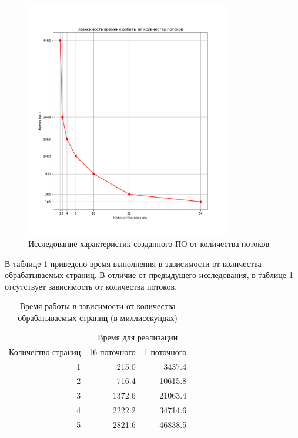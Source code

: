 \begin{figure}[h!]
    \centering
    \includegraphics[width=0.8\textwidth]{images/image1}
    \caption{Исследование характеристик созданного ПО от количества потоков}
    \label{fig:image1}
\end{figure}


\clearpage

В таблице \ref{tbl:time_measurements2} приведено время выполнения в зависимости
от количества обрабатываемых страниц. В отличие от предыдущего исследования,
в таблице \ref{tbl:time_measurements2} отсутствует зависимость от количества
потоков.

\begin{table}[h]
	\begin{center}
		\begin{threeparttable}
		\captionsetup{justification=raggedright,singlelinecheck=off}
		\caption{Время работы в зависимости от количества обрабатываемых страниц (в миллисекундах)}
		\label{tbl:time_measurements2}
                \begin{tabular}{|r|r|r|}
			\hline 
			& \multicolumn{2}{c|}{Время для реализации} \\
                        \cline{2-3}
			Количество страниц & 16-поточного & 1-поточного\\
			\hline
                        1 & 215.0 & 3437.4 \\
                         \hline
                        2 & 716.4 & 10615.8 \\
                         \hline
                        3 & 1372.6 & 21063.4 \\
                         \hline
                        4 & 2222.2 & 34714.6 \\
                         \hline
                        5 & 2821.6 & 46838.5 \\
                         \hline
		\end{tabular}
		\end{threeparttable}
    \end{center}
\end{table}

